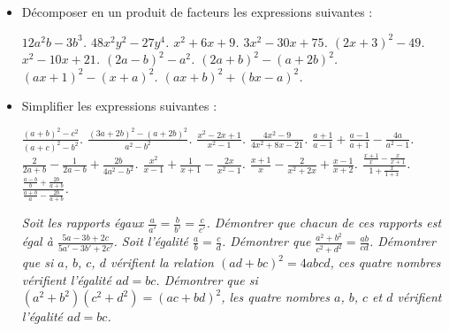 \begin{itemize}
\begin{itemize}
\it $(a+b-c)^2+(a-b+c)^2=2a^2+2(b-c)^2$.
\it $(a+b+c)^2-(a-b-c)^2=4a(b+c)$.
\it $(a+b)^3+(a-b)^3 = 2a(a^2+3b^2)$.
\it $(ab+1)^2+(a-b)^2=(a^2+1)(b^2+1)$.
\it $(ab+1)^2-(a+b)^2=(a^2-1)(b^2-1)$.
\end{itemize}
\item Décomposer en un produit de facteurs les expressions suivantes : 
\begin{itemize}
\it $12a^2b-3b^3$.
\it $48x^2y^2-27y^4$.
\it $x^2+6x+9$. 
\it $3x^2-30x+75$.
\it $(2x+3)^2-49$.
\it $x^2-10x+21$.
\it $(2a-b)^2-a^2$.
\it $(2a+b)^2-(a+2b)^2$.
\it $(ax+1)^2-(x+a)^2$. 
\it $(ax+b)^2+(bx-a)^2$.
\end{itemize}
\item Simplifier les expressions suivantes : 
\begin{itemize}
\it $\frac{(a+b)^2-c^2}{(a+c)^2-b^2}$.
\it $\frac{(3a+2b)^2-(a+2b)^2}{a^2-b^2}$.
\it $\frac{x^2-2x+1}{x^2-1}$.
\it $\frac{4x^2-9}{4x^2+8x-21}$.
\it $\frac{a+1}{a-1}+\frac{a-1}{a+1}-\frac{4a}{a^2-1}$.
\it $\frac2{2a+b}-\frac1{2a-b}+\frac{2b}{4a^2-b^2}$.
\it $\frac{x^2}{x-1}+\frac1{x+1}-\frac{2x}{x^2-1}$.
\it $\frac{x+1}x-\frac2{x^2+2x}+\frac{x-1}{x+2}$.
\it $\frac{\frac{x+1}x-\frac{x}{x+1}}{1+\frac{x}{1+x}}$.
\it $\frac{\frac{a-b}b+\frac{2b}{a+b}}{\frac{a+b}a-\frac{2b}{a+b}}$.
\end{itemize}
\it Soit les rapports égaux $\frac{a}{a'}=\frac{b}{b'}=\frac{c}{c'}$. Démontrer que chacun de ces rapports est égal à $\frac{5a-3b+2c}{5a'-3b'+2c'}$.
\it Soit l'égalité $\frac{a}b=\frac{c}d$. Démontrer que $\frac{a^2+b^2}{c^2+d^2} = \frac{ab}{cd}$.
\it Démontrer que si $a$, $b$, $c$, $d$ vérifient la relation $(ad+bc)^2=4abcd$, ces quatre nombres vérifient l'égalité $ad=bc$. 
\it Démontrer que si $(a^2+b^2)(c^2+d^2) = (ac+bd)^2$, les quatre nombres $a$, $b$, $c$ et $d$ vérifient l'égalité $ad=bc$.
\end{itemize}

